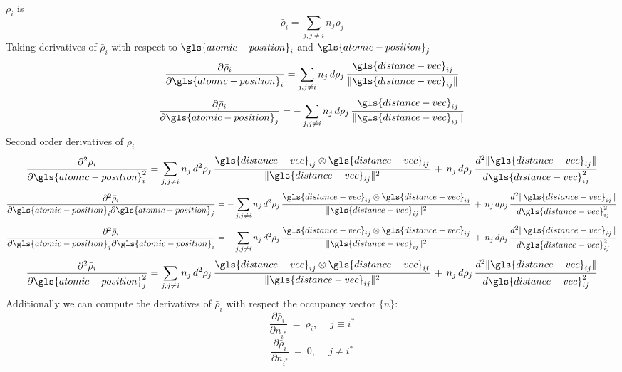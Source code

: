 \documentclass{article}
\begin{document}
$\bar{\rho}_i$ is
\begin{equation}
\bar{\rho}_i = \sum_{j, j \neq i} n_j \rho_j
\end{equation}
Taking derivatives of $\bar{\rho}_{i}$ with respect to $\gls{atomic-position}_i$ and $\gls{atomic-position}_j$
\begin{equation}
\frac{\partial \bar{\rho}_i}{\partial \gls{atomic-position}_i} = \sum_{j, j \neq i} n_j\, d\rho_j\, \frac{\gls{distance-vec}_{ij}}{\| \gls{distance-vec}_{ij} \|} 
\end{equation}
\begin{equation}
\frac{\partial \bar{\rho}_i}{\partial \gls{atomic-position}_j} = - \sum_{j, j \neq i} n_j\, d\rho_j\, \frac{\gls{distance-vec}_{ij}}{\| \gls{distance-vec}_{ij} \|} 
\end{equation}
Second order derivatives of $\bar{\rho}_{i}$
\begin{equation}
\frac{\partial^2 \bar{\rho}_i}{\partial \gls{atomic-position}_i^2} = \sum_{j, j \neq i} n_j\, d^2\rho_j\, \frac{\gls{distance-vec}_{ij} \otimes \gls{distance-vec}_{ij}}{\| \gls{distance-vec}_{ij} \|^2}\, +\, n_j\, d\rho_j\, \frac{d^2 \| \gls{distance-vec}_{ij} \| }{d \gls{distance-vec}_{ij}^2}
\end{equation}
\begin{equation}
\frac{\partial^2 \bar{\rho}_i}{\partial \gls{atomic-position}_i \partial \gls{atomic-position}_j} = - \sum_{j, j \neq i} n_j\, d^2\rho_j\, \frac{\gls{distance-vec}_{ij} \otimes \gls{distance-vec}_{ij}}{\| \gls{distance-vec}_{ij} \|^2}\, +\, n_j\, d\rho_j\, \frac{d^2 \| \gls{distance-vec}_{ij} \| }{d \gls{distance-vec}_{ij}^2}
\end{equation}
\begin{equation}
\frac{\partial^2 \bar{\rho}_i}{\partial \gls{atomic-position}_j \partial \gls{atomic-position}_i} = - \sum_{j, j \neq i} n_j\, d^2\rho_j\, \frac{\gls{distance-vec}_{ij} \otimes \gls{distance-vec}_{ij}}{\| \gls{distance-vec}_{ij} \|^2}\, +\, n_j\, d\rho_j\, \frac{d^2 \| \gls{distance-vec}_{ij} \| }{d \gls{distance-vec}_{ij}^2}
\end{equation}
\begin{equation}
\frac{\partial^2 \bar{\rho}_i}{\partial \gls{atomic-position}_j^2} = \sum_{j, j \neq i} n_j\, d^2\rho_j\, \frac{\gls{distance-vec}_{ij} \otimes \gls{distance-vec}_{ij}}{\| \gls{distance-vec}_{ij} \|^2}\, +\, n_j\, d\rho_j\, \frac{d^2 \| \gls{distance-vec}_{ij} \| }{d \gls{distance-vec}_{ij}^2}
\end{equation}
Additionally we can compute the derivatives of $\bar{\rho}_{i}$ with respect the occupancy vector $\{n\}$:
\begin{equation}
    \frac{\partial \bar{\rho}_{i}}{\partial n_{i^{*}}}\ =\ \rho_{i},\ \quad j \equiv i^{*}
\end{equation}
\begin{equation}
    \frac{\partial \bar{\rho}_{i}}{\partial n_{i^{*}}}\ =\ 0,\ \quad j \neq i^{*}
\end{equation}
\end{document}
